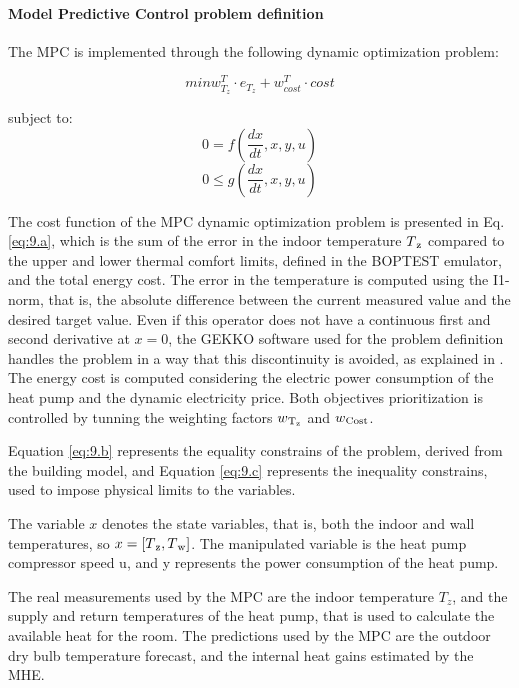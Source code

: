 \paragraph{Model Predictive Control problem definition} The MPC is implemented through the following dynamic optimization problem:

\begin{equation}
min w_{T_z}^T \cdot e_{T_z} + w_{cost}^T \cdot cost
\label{eq:9.a}
\end{equation}

subject to:
\begin{equation}
0=f(\frac{dx}{dt},x,y,u)
\label{eq:9.b}
\end{equation}
\begin{equation}
0\leq g(\frac{dx}{dt},x,y,u)
\label{eq:9.c}
\end{equation}

The cost function of the MPC dynamic optimization problem is presented in Eq. \ref{eq:9.a}, which is the sum of the error in the indoor temperature $T\textsubscript{z}$ compared to the upper and lower thermal comfort limits, defined in the BOPTEST emulator, and the total energy cost. The error in the temperature is computed using the I1-norm, that is, the absolute difference between the current measured value and the desired target value. Even if this operator does not have a continuous first and second derivative at $x=0$, the GEKKO software used for the problem definition handles the problem in a way that this discontinuity is avoided, as explained in \cite{Hedengren2017}. The energy cost is computed considering the electric power consumption of the heat pump and the dynamic electricity price. Both objectives prioritization is controlled by tunning the weighting factors $w\textsubscript{T\textsubscript{z}}$ and $w\textsubscript{Cost}$.

Equation \ref{eq:9.b} represents the equality constrains of the problem, derived from the building model, and Equation \ref{eq:9.c} represents the inequality constrains, used to impose physical limits to the variables.

The variable $x$ denotes the state variables, that is, both the indoor and wall temperatures, so $x=[T\textsubscript{z},T\textsubscript{w}]$. The manipulated variable is the heat pump compressor speed u, and y represents the power consumption of the heat pump. 

The real measurements used by the MPC are the indoor temperature $T_z$, and the supply and return temperatures of the heat pump, that is used to calculate the available heat for the room. The predictions used by the MPC are the outdoor dry bulb temperature forecast, and the internal heat gains estimated by the MHE.

